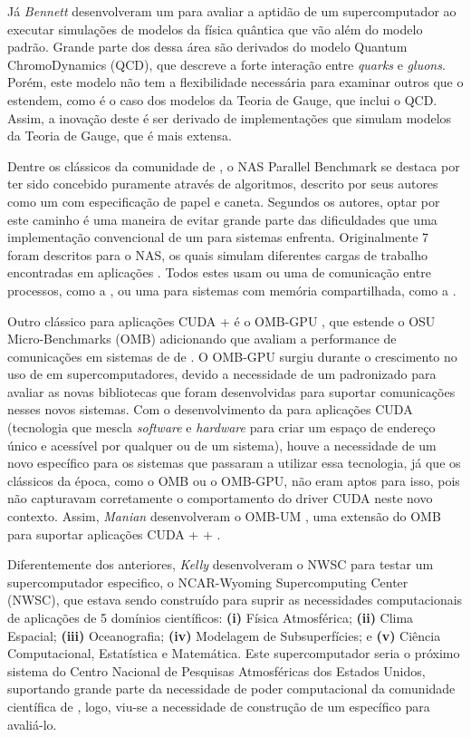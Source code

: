 Já \textit{Bennett} \etal \cite{bennettqcdbench} desenvolveram um \bench para avaliar a aptidão de um supercomputador ao executar simulações de modelos da física quântica que vão além do modelo padrão. Grande parte dos \benchs dessa área são derivados do modelo Quantum ChromoDynamics (QCD), que descreve a forte interação entre \textit{quarks} e \textit{gluons}. Porém, este modelo não tem a flexibilidade necessária para examinar outros que o estendem, como é o caso dos modelos da Teoria de Gauge, que inclui o QCD. Assim, a inovação deste \bench é ser derivado de implementações que simulam modelos da Teoria de Gauge, que é mais extensa. 

Dentre os \benchs clássicos da comunidade de \HPC, o NAS Parallel Benchmark \cite{baileynasbench} se destaca por ter sido concebido puramente através de algoritmos, descrito por seus autores como um \bench com especificação de papel e caneta. Segundos os autores, optar por este caminho é uma maneira de evitar grande parte das dificuldades que uma implementação convencional de um \bench para sistemas \HPC enfrenta. Originalmente 7  foram descritos para o NAS, os quais simulam diferentes cargas de trabalho encontradas em aplicações \HPC. Todos estes  usam ou uma \API de comunicação entre processos, como a \MPI, ou uma \API para sistemas com memória compartilhada, como a \OpenMP.

Outro \bench clássico para aplicações CUDA + \MPI é o OMB-GPU \cite{bureddyomb}, que estende o OSU Micro-Benchmarks (OMB) adicionando  que avaliam a performance de comunicações \MPI em sistemas de \clusters de \GPUs. O OMB-GPU surgiu durante o crescimento no uso de \GPUs em supercomputadores, devido a necessidade de um \bench padronizado para avaliar as novas bibliotecas \MPI que foram desenvolvidas para suportar comunicações \MPI nesses novos sistemas. Com o desenvolvimento da \UM para aplicações CUDA (tecnologia que mescla \textit{software} e \textit{hardware} para criar um espaço de endereço único e acessível por qualquer \GPU ou \CPU de um sistema), houve a necessidade de um novo \bench específico para os sistemas que passaram a utilizar essa tecnologia, já que os \benchs clássicos da época, como o OMB ou o OMB-GPU, não eram aptos para isso, pois não capturavam corretamente o comportamento do driver CUDA neste novo contexto. Assim, \textit{Manian} \etal desenvolveram o OMB-UM \cite{maniancudaum}, uma extensão do OMB para suportar aplicações CUDA + \MPI + \UM.

Diferentemente dos \benchs anteriores, \textit{Kelly} \etal \cite{kellynwsc} desenvolveram o \bench NWSC para testar um supercomputador especifico, o NCAR-Wyoming Supercomputing Center (NWSC), que estava sendo construído para suprir as necessidades computacionais de aplicações \HPC de 5 domínios científicos: \textbf{(i)} Física Atmosférica; \textbf{(ii)} Clima Espacial; \textbf{(iii)} Oceanografia; \textbf{(iv)} Modelagem de Subsuperfícies; e \textbf{(v)} Ciência Computacional, Estatística e Matemática. Este supercomputador seria o próximo sistema \HPC do Centro Nacional de Pesquisas Atmosféricas dos Estados Unidos, suportando grande parte da necessidade de poder computacional da comunidade científica de \HPC, logo, viu-se a necessidade de construção de um \bench específico para avaliá-lo.


